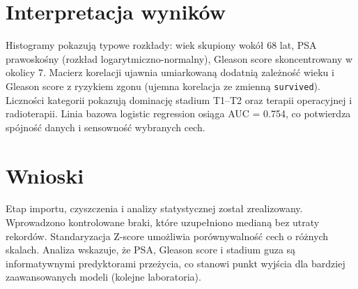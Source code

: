 \documentclass[12pt,a4paper]{article}
\begin{document}
\section{Interpretacja wyników}
Histogramy pokazują typowe rozkłady: wiek skupiony wokół 68 lat, PSA prawoskośny (rozkład logarytmiczno-normalny), Gleason score skoncentrowany w okolicy 7. Macierz korelacji ujawnia umiarkowaną dodatnią zależność wieku i Gleason score z ryzykiem zgonu (ujemna korelacja ze zmienną \texttt{survived}). Liczności kategorii pokazują dominację stadium T1--T2 oraz terapii operacyjnej i radioterapii. Linia bazowa logistic regression osiąga AUC = 0.754, co potwierdza spójność danych i sensowność wybranych cech.

\section{Wnioski}
Etap importu, czyszczenia i analizy statystycznej został zrealizowany. Wprowadzono kontrolowane braki, które uzupełniono medianą bez utraty rekordów. Standaryzacja Z-score umożliwia porównywalność cech o różnych skalach. Analiza wskazuje, że PSA, Gleason score i stadium guza są informatywnymi predyktorami przeżycia, co stanowi punkt wyjścia dla bardziej zaawansowanych modeli (kolejne laboratoria).
\end{document}
